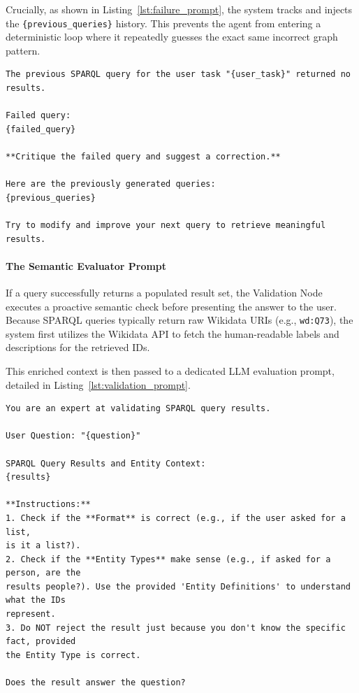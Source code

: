 Crucially, as shown in Listing~\ref{lst:failure_prompt}, the system tracks and injects the \texttt{\{previous\_queries\}} history. This prevents the agent from entering a deterministic loop where it repeatedly guesses the exact same incorrect graph pattern.

\begin{lstlisting}[basicstyle=\ttfamily\footnotesize, frame=single, caption={The dynamic feedback prompt injected into the state when a query returns no results, forcing the LLM to critique its previous attempts.}, label={lst:failure_prompt}]
The previous SPARQL query for the user task "{user_task}" returned no results.

Failed query:
{failed_query}

**Critique the failed query and suggest a correction.**

Here are the previously generated queries:
{previous_queries}

Try to modify and improve your next query to retrieve meaningful results.
\end{lstlisting}

\paragraph{The Semantic Evaluator Prompt}
If a query successfully returns a populated result set, the Validation Node executes a proactive semantic check before presenting the answer to the user. Because SPARQL queries typically return raw Wikidata URIs (e.g., \texttt{wd:Q73}), the system first utilizes the Wikidata API to fetch the human-readable labels and descriptions for the retrieved IDs. 

This enriched context is then passed to a dedicated LLM evaluation prompt, detailed in Listing~\ref{lst:validation_prompt}.

\begin{lstlisting}[basicstyle=\ttfamily\footnotesize, frame=single, caption={The strict evaluation prompt used by the Validation Node to ensure the retrieved entity types align with the user's semantic intent.}, label={lst:validation_prompt}]
You are an expert at validating SPARQL query results. 

User Question: "{question}"

SPARQL Query Results and Entity Context:
{results}

**Instructions:**
1. Check if the **Format** is correct (e.g., if the user asked for a list, 
is it a list?).
2. Check if the **Entity Types** make sense (e.g., if asked for a person, are the 
results people?). Use the provided 'Entity Definitions' to understand what the IDs 
represent.
3. Do NOT reject the result just because you don't know the specific fact, provided
the Entity Type is correct.

Does the result answer the question?
\end{lstlisting}

